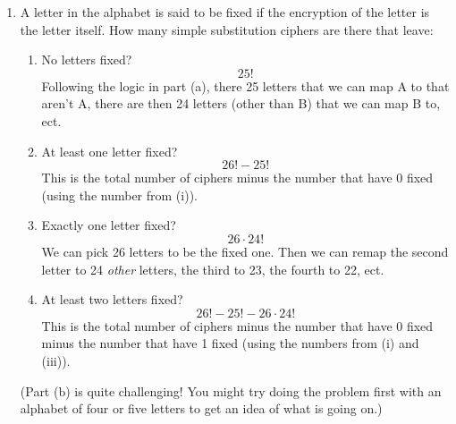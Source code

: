 \documentclass[12pt]{amsart}
\theoremstyle{definition}
\begin{document}
\begin{enumerate}
\begin{enumerate}
			\item  A letter in the alphabet is said to be fixed if the encryption of the letter is the
				letter itself. How many simple substitution ciphers are there that leave:
		
			\begin{enumerate}
				\item No letters fixed? 
				$$25!$$ Following the logic in part (a), there 25 letters that we can map A to that aren't A, there are then 24 letters (other than B) that we can map B to, ect.\\
				\item At least one letter fixed?  $$26! - 25!$$
				This is the total number of ciphers minus the number that have 0 fixed (using the number from (i)).\\
				\item Exactly one letter fixed?
				$$26 \cdot 24!$$ We can pick 26 letters to be the fixed one. Then we can remap the second letter to 24 \emph{other} letters, the third to 23, the fourth to 22, ect.\\
				\item At least two letters fixed?
				$$26!-25!-26\cdot 24!$$ This is the total number of ciphers minus the number that have 0 fixed minus the number that have 1 fixed (using the numbers from (i) and (iii)).\\
				
			\end{enumerate}
			(Part (b) is quite challenging! You might try doing the problem first with an alphabet 
			of four or five letters to get an idea of what is going on.)
		\end{enumerate}
\end{enumerate}
\end{document}
